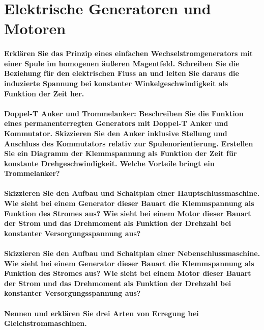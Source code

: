 \documentclass[a4paper, 11pt, parskip=half]{scrartcl}
\begin{document}
\newpage

\section{Elektrische Generatoren und Motoren}

\paragraph{Erklären Sie das Prinzip eines einfachen Wechselstromgenerators mit einer Spule im
homogenen äußeren Magentfeld. Schreiben Sie die Beziehung für den elektrischen Fluss an und leiten
Sie daraus die induzierte Spannung bei konstanter Winkelgeschwindigkeit als Funktion der Zeit her.}

\paragraph{Doppel-T Anker und Trommelanker: Beschreiben Sie die Funktion eines permanenterregten
Generators mit Doppel-T Anker und Kommutator. Skizzieren Sie den Anker inklusive Stellung und
Anschluss des Kommutators relativ zur Spulenorientierung. Erstellen Sie ein Diagramm der
Klemmspannung als Funktion der Zeit für konstante Drehgeschwindigkeit. Welche Vorteile bringt ein
Trommelanker?}

\paragraph{Skizzieren Sie den Aufbau und Schaltplan einer Hauptschlussmaschine. Wie sieht bei einem
Generator dieser Bauart die Klemmspannung als Funktion des Stromes aus? Wie sieht bei einem Motor
dieser Bauart der Strom und das Drehmoment als Funktion der Drehzahl bei konstanter
Versorgungsspannung aus?}

\paragraph{Skizzieren Sie den Aufbau und Schaltplan einer Nebenschlussmaschine. Wie sieht bei einem
Generator dieser Bauart die Klemmspannung als Funktion des Stromes aus? Wie sieht bei einem Motor
dieser Bauart der Strom und das Drehmoment als Funktion der Drehzahl bei konstanter
Versorgungsspannung aus?}

\paragraph{Nennen und erklären Sie drei Arten von Erregung bei Gleichstrommaschinen.}
\end{document}
